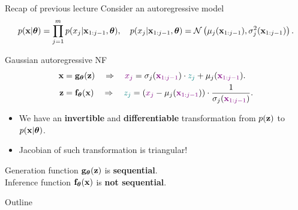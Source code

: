 \begin{frame}{Recap of previous lecture}
	Consider an autoregressive model
	\vspace{-0.3cm}
	{\small
		\[
		p(\mathbf{x} | \boldsymbol{\theta}) = \prod_{j=1}^m p(x_j | \mathbf{x}_{1:j - 1}, \boldsymbol{\theta}), \quad
		p(x_j | \mathbf{x}_{1:j - 1}, \boldsymbol{\theta}) = \mathcal{N} \left(\mu_j(\mathbf{x}_{1:j-1}), \sigma^2_j (\mathbf{x}_{1:j-1})\right).
		\]
	}
	\vspace{-0.5cm}
	\begin{block}{Gaussian autoregressive NF}
		\vspace{-0.5cm}
		\begin{align*}
			\mathbf{x} &= \mathbf{g}_{\boldsymbol{\theta}}(\mathbf{z}) \quad \Rightarrow \quad {\color{violet} x_j} = \sigma_j ({\color{violet} \mathbf{x}_{1:j-1}}) \cdot {\color{teal} z_j} + \mu_j({\color{violet} \mathbf{x}_{1:j-1}}). \\
			\mathbf{z} &= \mathbf{f}_{\boldsymbol{\theta}}(\mathbf{x}) \quad \Rightarrow \quad {\color{teal} z_j} = \left({\color{violet}x_j} - \mu_j({\color{violet}\mathbf{x}_{1:j-1}}) \right) \cdot \frac{1}{ \sigma_j ({\color{violet}\mathbf{x}_{1:j-1}})}.
		\end{align*}
		\vspace{-0.5cm}
	\end{block}
	\begin{itemize}
		\item We have an \textbf{invertible} and \textbf{differentiable} transformation from $p(\mathbf{z})$ to $p(\mathbf{x} | \boldsymbol{\theta})$.
		\item Jacobian of such transformation is triangular!
	\end{itemize}
	Generation function $\mathbf{g}_{\boldsymbol{\theta}}(\mathbf{z})$ is \textbf{sequential}. \\ Inference function $\mathbf{f}_{\boldsymbol{\theta}}(\mathbf{x})$ is \textbf{not sequential}.
	
\end{frame}
\begin{frame}{Outline}
    \tableofcontents
\end{frame}
